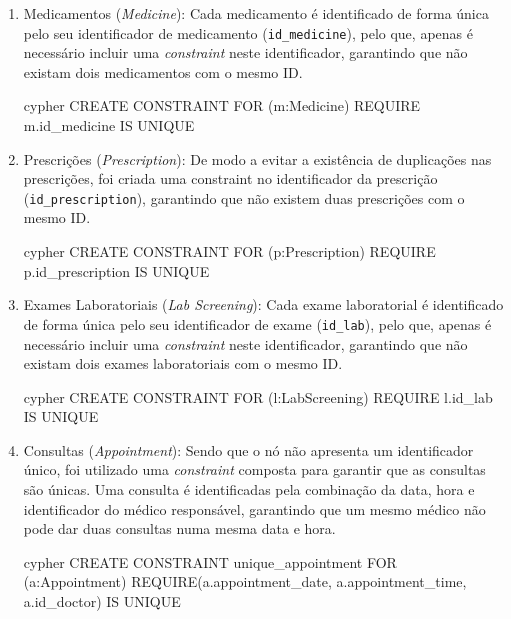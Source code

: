 \begin{enumerate}
    \item Medicamentos (\textit{Medicine}): Cada medicamento é identificado de forma única pelo seu identificador de medicamento (\texttt{id\_medicine}), pelo que, apenas é necessário incluir uma \textit{constraint} neste identificador, garantindo que não existam dois medicamentos com o mesmo ID.
    
    \begin{myminted}{cypher}
    CREATE CONSTRAINT FOR (m:Medicine) REQUIRE m.id_medicine IS UNIQUE
    \end{myminted}
    
    \item Prescrições (\textit{Prescription}): De modo a evitar a existência de duplicações nas prescrições, foi criada uma constraint no identificador da prescrição (\texttt{id\_prescription}), garantindo que não existem duas prescrições com o mesmo ID.
    
    \begin{myminted}{cypher}
    CREATE CONSTRAINT FOR (p:Prescription) REQUIRE p.id_prescription IS UNIQUE  
    \end{myminted}
    
    \item Exames Laboratoriais (\textit{Lab Screening}): Cada exame laboratorial é identificado de forma única pelo seu identificador de exame (\texttt{id\_lab}), pelo que, apenas é necessário incluir uma \textit{constraint} neste identificador, garantindo que não existam dois exames laboratoriais com o mesmo ID.
    
    \begin{myminted}{cypher}
    CREATE CONSTRAINT FOR (l:LabScreening) REQUIRE l.id_lab IS UNIQUE
    \end{myminted}
    
    \item Consultas (\textit{Appointment}): Sendo que o nó não apresenta um identificador único, foi utilizado uma \textit{constraint} composta para garantir que as consultas são únicas. Uma consulta é identificadas pela combinação da data, hora e identificador do médico responsável, garantindo que um mesmo médico não pode dar duas consultas numa mesma data e hora. 
    
    \begin{myminted}{cypher}
    CREATE CONSTRAINT unique_appointment FOR (a:Appointment) REQUIRE(a.appointment_date, a.appointment_time, a.id_doctor) IS UNIQUE
    \end{myminted}
    

\end{enumerate}
